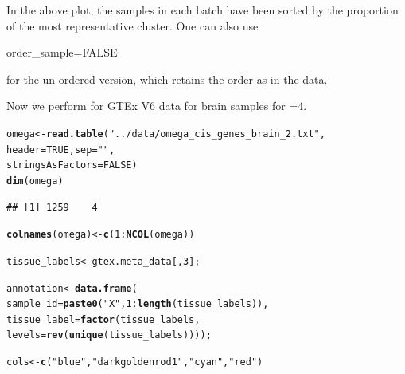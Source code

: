 \documentclass[12pt]{article}\usepackage[]{graphicx}\usepackage[usenames,dvipsnames]{color}
\makeatletter
\newcommand{\hlnum}[1]{\textcolor[rgb]{0.686,0.059,0.569}{#1}}%
\newcommand{\hlstr}[1]{\textcolor[rgb]{0.192,0.494,0.8}{#1}}%
\newcommand{\hlopt}[1]{\textcolor[rgb]{0,0,0}{#1}}%
\newcommand{\hlstd}[1]{\textcolor[rgb]{0.345,0.345,0.345}{#1}}%
\newcommand{\hlkwb}[1]{\textcolor[rgb]{0.69,0.353,0.396}{#1}}%
\newcommand{\hlkwc}[1]{\textcolor[rgb]{0.333,0.667,0.333}{#1}}%
\newcommand{\hlkwd}[1]{\textcolor[rgb]{0.737,0.353,0.396}{\textbf{#1}}}%
\newenvironment{kframe}{%
 \def\at@end@of@kframe{}%
 \ifinner\ifhmode%
  \def\at@end@of@kframe{\end{minipage}}%
  \begin{minipage}{\columnwidth}%
 \fi\fi%
 \def\FrameCommand##1{\hskip\@totalleftmargin \hskip-\fboxsep
 \colorbox{shadecolor}{##1}\hskip-\fboxsep
     \hskip-\linewidth \hskip-\@totalleftmargin \hskip\columnwidth}%
 \MakeFramed {\advance\hsize-\width
   \@totalleftmargin\z@ \linewidth\hsize
   \@setminipage}}%
 {\par\unskip\endMakeFramed%
 \at@end@of@kframe}
\newenvironment{knitrout}{}{} %
\makeatother
\begin{document}
In the above plot, the samples in each batch have been sorted by the proportion of the most representative cluster. One can also use \begin{verb} order_sample=FALSE \end{verb} for the un-ordered version, which retains the order as in the data.

Now we perform for GTEx V6 data for brain samples for =4.

\begin{knitrout}
\color{fgcolor}\begin{kframe}
\begin{alltt}
\hlstd{omega} \hlkwb{<-} \hlkwd{read.table}\hlstd{(}\hlstr{"../data/omega_cis_genes_brain_2.txt"}\hlstd{,}
                    \hlkwc{header} \hlstd{=} \hlnum{TRUE}\hlstd{,} \hlkwc{sep} \hlstd{=} \hlstr{" "}\hlstd{,}
                    \hlkwc{stringsAsFactors} \hlstd{=} \hlnum{FALSE}\hlstd{)}
\hlkwd{dim}\hlstd{(omega)}
\end{alltt}
\begin{verbatim}
## [1] 1259    4
\end{verbatim}
\begin{alltt}
\hlkwd{colnames}\hlstd{(omega)} \hlkwb{<-} \hlkwd{c}\hlstd{(}\hlnum{1}\hlopt{:}\hlkwd{NCOL}\hlstd{(omega))}

\hlstd{tissue_labels} \hlkwb{<-} \hlstd{gtex.meta_data[,}\hlnum{3}\hlstd{];}


\hlstd{annotation} \hlkwb{<-} \hlkwd{data.frame}\hlstd{(}
    \hlkwc{sample_id} \hlstd{=} \hlkwd{paste0}\hlstd{(}\hlstr{"X"}\hlstd{,} \hlnum{1}\hlopt{:}\hlkwd{length}\hlstd{(tissue_labels)),}
    \hlkwc{tissue_label} \hlstd{=} \hlkwd{factor}\hlstd{(tissue_labels,}
                          \hlkwc{levels} \hlstd{=} \hlkwd{rev}\hlstd{(}\hlkwd{unique}\hlstd{(tissue_labels) ) ) );}

\hlstd{cols} \hlkwb{<-} \hlkwd{c}\hlstd{(}\hlstr{"blue"}\hlstd{,} \hlstr{"darkgoldenrod1"}\hlstd{,} \hlstr{"cyan"}\hlstd{,} \hlstr{"red"}\hlstd{)}
\end{alltt}
\end{kframe}
\end{knitrout}
\end{document}
